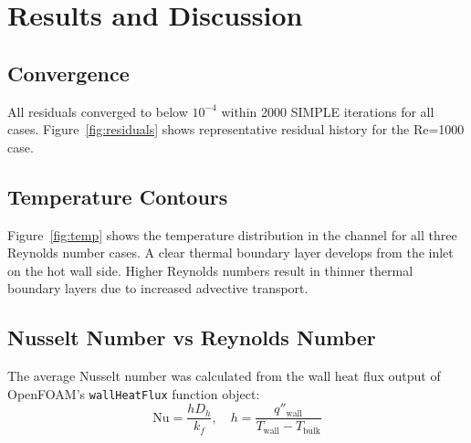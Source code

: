 \documentclass[12pt, a4paper]{article}
\begin{document}
\section{Results and Discussion}

\subsection{Convergence}
All residuals converged to below $10^{-4}$ within 2000 SIMPLE iterations for all cases. Figure~\ref{fig:residuals} shows representative residual history for the Re=1000 case.


\subsection{Temperature Contours}
Figure~\ref{fig:temp} shows the temperature distribution in the channel for all three Reynolds number cases. A clear thermal boundary layer develops from the inlet on the hot wall side. Higher Reynolds numbers result in thinner thermal boundary layers due to increased advective transport.


\subsection{Nusselt Number vs Reynolds Number}

The average Nusselt number was calculated from the wall heat flux output of OpenFOAM's \texttt{wallHeatFlux} function object:
\begin{equation}
    \text{Nu} = \frac{h D_h}{k_f}, \quad h = \frac{q''_\text{wall}}{T_\text{wall} - T_\text{bulk}}
\end{equation}
\end{document}
